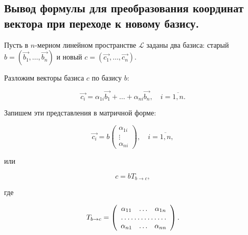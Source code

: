 \subsection{
    Вывод формулы для преобразования координат вектора при переходе к новому базису.
}

Пусть в $n$-мерном линейном пространстве $\mathcal{L}$ заданы два базиса: старый $b = (\vec{b_1}, \ldots, \vec{b_n})$ и новый $c = (\vec{c_1}, \ldots, \vec{c_n})$.

Разложим векторы базиса $c$ по базису $b$:

$$\vec{c_i} = \alpha_{1i}\vec{b_1} + \ldots + \alpha_{ni}\vec{b_n}, \quad i = \overline{1, n}.$$

Запишем эти представления в матричной форме:

$$\vec{c_i} = b \begin{pmatrix} \alpha_{1i} \\ \vdots \\ \alpha_{ni} \end{pmatrix}, \quad  i = \overline{1, n},$$

или

$$c = bT_{b \to c},$$

где

\begin{equation*}
    T_{b \to c} = \left(\begin{array}{ccc}
        \alpha_{11} & \ldots & \alpha_{1n} \\
        \hdotsfor{3} \\
        \alpha_{n1} & \ldots & \alpha_{nn}
    \end{array}\right).
\end{equation*}
